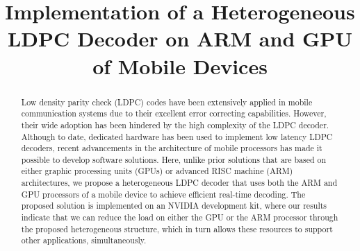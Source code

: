 \documentclass[conference]{IEEEtran}
\begin{document}
\title{Implementation of a Heterogeneous LDPC Decoder on ARM and GPU of Mobile Devices}

\author{}


\maketitle

\begin{abstract}

Low density parity check (LDPC) codes have been extensively applied in mobile communication systems due to their excellent error correcting capabilities. However, their wide adoption has been hindered by the high complexity of the LDPC decoder. Although to date, dedicated hardware has been used to implement low latency LDPC decoders, recent advancements in the architecture of mobile processors has made it possible to develop software solutions. Here, unlike prior solutions that are based on either graphic processing units (GPUs) or advanced RISC machine (ARM) architectures, we propose a heterogeneous LDPC decoder that uses both the ARM and GPU processors of a mobile device to achieve efficient real-time decoding. The proposed solution is implemented on an NVIDIA development kit, where our results indicate that we can reduce the load on either the GPU or the ARM processor through the proposed heterogeneous structure, which in turn allows these resources to support other applications, simultaneously.

\end{abstract}

\end{document}
